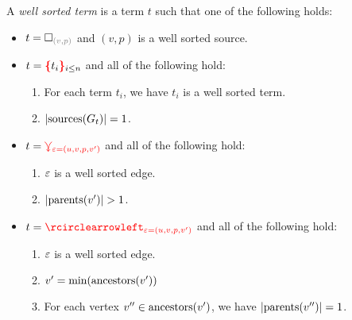 \begin{definition}
  A \emph{well sorted term} is a term $t$ such that one of the following holds:
  \begin{itemize}

    \item $t = \emptyHole{v}{p}$ and $(v, p)$ is a well sorted source.

    \item $t = \conflictHole[i \leq n]{t_i}$ and all of the following hold:
      \begin{enumerate}
        \item For each term $t_i$, we have $t_i$ is a well sorted term.
        \item $\left\lvert\text{sources}\mathopen{}\left(G_t\right)\mathclose{}\right\rvert = 1$.
      \end{enumerate}

    \item $t = \textcolor{red}{\curlyveedownarrow_{\varepsilon{=}(u, v, p, v')}}$ and all of the following hold:
      \begin{enumerate}
        \item $\varepsilon$ is a well sorted edge.
        \item $\left\lvert\operatorname{\text{parents}}\mathopen{}\left(v'\right)\mathclose{}\right\rvert > 1$.
      \end{enumerate}

    \item $t = \cycleVertex{\e{=}(u, v, p, v')}$ and all of the following hold:
      \begin{enumerate}
        \item $\varepsilon$ is a well sorted edge.
        \item $v' = \operatorname{\text{min}}\mathopen{}\left(\operatorname{\text{ancestors}}\mathopen{}\left(v'\right)\mathclose{}\right)\mathclose{}$
        \item For each vertex $v'' \in \operatorname{\text{ancestors}}\mathopen{}\left(v'\right)\mathclose{}$, we have $\left\lvert\operatorname{\text{parents}}\mathopen{}\left(v''\right)\mathclose{}\right\rvert = 1$.
      \end{enumerate}


\end{itemize}
\end{definition}

